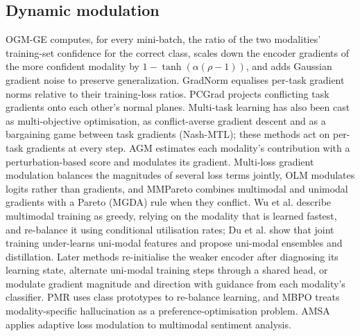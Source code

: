\documentclass[fleqn,10pt]{wlscirep}
\begin{document}
\subsection*{Dynamic modulation}
OGM-GE\cite{peng2022balanced} computes, for every mini-batch, the ratio of the two modalities' training-set confidence for the correct class, scales down the encoder gradients of the more confident modality by $1-\tanh(\alpha(\rho-1))$, and adds Gaussian gradient noise to preserve generalization. GradNorm\cite{chen2018gradnorm} equalises per-task gradient norms relative to their training-loss ratios. PCGrad\cite{yu2020gradient} projects conflicting task gradients onto each other's normal planes. Multi-task learning has also been cast as multi-objective optimisation\cite{sener2018multi}, as conflict-averse gradient descent\cite{liu2021conflict} and as a bargaining game between task gradients (Nash-MTL)\cite{navon2022multi}; these methods act on per-task gradients at every step. AGM\cite{li2023boosting} estimates each modality's contribution with a perturbation-based score and modulates its gradient. Multi-loss gradient modulation\cite{kontras2024improving} balances the magnitudes of several loss terms jointly, OLM\cite{zong2024balancing} modulates logits rather than gradients, and MMPareto\cite{wei2024mmpareto} combines multimodal and unimodal gradients with a Pareto (MGDA\cite{desideri2012mgda}) rule when they conflict. Wu et al.\cite{wu2022characterizing} describe multimodal training as greedy, relying on the modality that is learned fastest, and re-balance it using conditional utilisation rates; Du et al.\cite{du2023unimodal} show that joint training under-learns uni-modal features and propose uni-modal ensembles and distillation. Later methods re-initialise the weaker encoder after diagnosing its learning state\cite{wei2024diagnosing}, alternate uni-modal training steps through a shared head\cite{zhang2024multimodal}, or modulate gradient magnitude and direction with guidance from each modality's classifier\cite{guo2024classifier}. PMR\cite{fan2023pmr} uses class prototypes to re-balance learning, and MBPO\cite{liu2025modality} treats modality-specific hallucination as a preference-optimisation problem. AMSA\cite{wang2023amsa} applies adaptive loss modulation to multimodal sentiment analysis.
\end{document}
